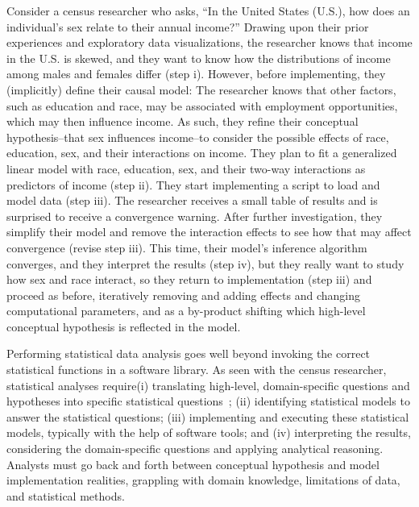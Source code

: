 
Consider a census researcher who asks, ``In the United States (U.S.),
how does an individual's sex relate to their annual income?'' Drawing upon their
prior experiences and exploratory data visualizations, the researcher knows that
income in the U.S. is skewed, and they want to know how the distributions of
income among males and females differ (step i). However, before implementing,
they (implicitly) define their causal model: The researcher knows that other
factors, such as education and race, may be associated with employment
opportunities, which may then influence income. As such, they refine their
conceptual hypothesis--that sex influences income--to consider the possible
effects of race, education, sex, and their interactions on income. They plan to
fit a generalized linear model with race, education, sex, and their two-way
interactions as predictors of income (step ii). They start implementing a script
to load and model data (step iii). The researcher receives a small table of
results and is surprised to receive a convergence warning. After further
investigation, they simplify their model and remove the interaction effects to
see how that may affect convergence (revise step iii). This time, their model's
inference algorithm converges, and they interpret the results (step iv), but
they really want to study how sex and race interact, so they return to
implementation (step iii) and proceed as before, iteratively removing and adding
effects and changing computational parameters, and as a by-product shifting
which high-level conceptual hypothesis is reflected in the model.

Performing statistical data analysis goes well beyond invoking the correct
statistical functions in a software library. As seen with the census researcher,
statistical analyses require(i) translating high-level, domain-specific
questions and hypotheses into specific statistical
questions~\cite{carver2016guidelines}; (ii) identifying statistical models to
answer the statistical questions; (iii) implementing and executing these
statistical models, typically with the help of software tools; and (iv)
interpreting the results, considering the domain-specific questions and applying
analytical reasoning. Analysts must go back and forth between conceptual
hypothesis and model implementation realities, grappling with domain knowledge,
limitations of data, and statistical methods.

